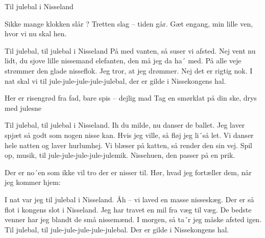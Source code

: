 \begin{sang}{Til julebal i Nisseland}{}
\begin{vers}
Sikke mange klokken slår ?
Tretten slag – tiden går.
Gæt engang, min lille ven,
hvor vi nu skal hen.
\end{vers}
\begin{vers}
Til julebal, til julebal i Nisseland
På med vanten, så suser vi afsted.
Nej vent nu lidt, du sjove lille nissemand
elefanten, den må jeg da ha´ med.
På alle veje strømmer den glade nisseflok.
Jeg tror, at jeg drømmer.
Nej det er rigtig nok.
I nat skal vi til jule-jule-jule-jule-julebal,
der er gilde i Nissekongens hal.
\end{vers}
\begin{vers}
Her er risengrød fra fad,
bare spis – dejlig mad
Tag en smørklat på din ske,
drys med julesne
\end{vers}
\begin{vers}
Til julebal, til julebal i Nisseland.
Ih du milde, nu danser de ballet.
Jeg laver spjæt så godt som nogen nisse kan.
Hvis jeg ville, så fløj jeg li´så let.
Vi danser hele natten og laver hurlumhej.
Vi blæser på katten, så render den sin vej.
Spil op, musik, til jule-jule-jule-jule-julemik.
Nissehuen, den passer på en prik.
\end{vers}
\vspace{10cm}
\begin{vers}
Der er no´en som ikke vil
tro der er nisser til.
Hør, hvad jeg fortæller dem,
når jeg kommer hjem:
\end{vers}
\begin{vers}
I nat var jeg til julebal i Nisseland.
Åh – vi laved en masse nisseskæg.
Der er så flot i kongens slot i Nisseland.
Jeg har travet en mil fra væg til væg.
De bedste venner har jeg blandt de små nissemænd.
I morgen, så ta´r jeg måske afsted igen.
Til julebal, til jule-jule-jule-jule-julebal.
Der er gilde i Nissekongens hal.
\end{vers}
\laps
\end{sang}
